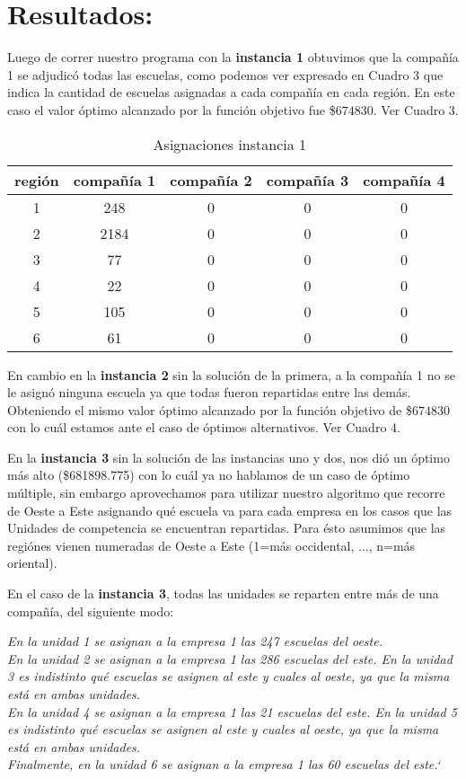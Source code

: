 \documentclass[12pt]{article}
\begin{document}
  \section{Resultados:}
Luego de correr nuestro programa con la  \textbf{instancia 1} obtuvimos que la compañía 1 se adjudicó todas las escuelas, como podemos ver expresado en Cuadro 3 que indica la cantidad de escuelas asignadas a cada compañía en cada región. En este caso el valor óptimo alcanzado por la función objetivo fue \$$674830$. Ver Cuadro 3.
  
\begin{table}[h!]
\centering
\begin{tabular}{|| c || c | c | c | c||} 
 \hline
     región & compañía 1 & compañía 2 & compañía 3 & compañía 4 \\ [0.5ex] 
 \hline\hline
 1 & 248 & 0 & 0 & 0 \\ 
 2 & 2184 & 0 & 0 & 0 \\
 3 & 77 & 0 & 0 & 0 \\
 4 & 22 & 0 & 0 & 0 \\
 5 & 105 & 0 & 0 & 0 \\
 6 & 61 & 0 & 0 & 0 \\
 [1ex] 
 \hline
\end{tabular}
\caption{Asignaciones instancia 1}
\label{table:1}
\end{table}

En cambio en la \textbf{instancia 2} sin la solución de la primera, a la compañía 1 no se le asignó ninguna escuela ya que todas fueron repartidas entre las demás. Obteniendo el mismo valor óptimo alcanzado por la función objetivo de \$$674830$ con lo cuál estamos ante el caso de óptimos alternativos. Ver Cuadro 4.

\bigskip
En la \textbf{instancia 3} sin la solución de las instancias uno y dos, nos dió un óptimo más alto (\$681898.775) con lo cuál ya no hablamos de un caso de óptimo múltiple, sin embargo aprovechamos para utilizar nuestro algoritmo que recorre de Oeste a Este asignando qué escuela va para cada empresa en los casos que las Unidades de competencia se encuentran repartidas. Para ésto asumimos que las regiónes vienen numeradas de Oeste a Este (1=más occidental, ..., n=más oriental).

En el caso de la \textbf{instancia 3}, todas las unidades se reparten entre más de una compañía, del siguiente modo:

\textit{En la unidad 1 se asignan a la empresa 1 las 247 escuelas del oeste.\\
En la unidad 2 se asignan a la empresa 1 las 286 escuelas del este. En la unidad 3 es indistinto qué escuelas se asignen al este y cuales al oeste, ya que la misma está en ambas unidades.\\
En la unidad 4 se asignan a la empresa 1 las 21 escuelas del este. En la unidad 5 es indistinto qué escuelas se asignen al este y cuales al oeste, ya que la misma está en ambas unidades.\\
Finalmente, en la unidad 6 se asignan a la empresa 1 las 60 escuelas del este.`}
\end{document}
